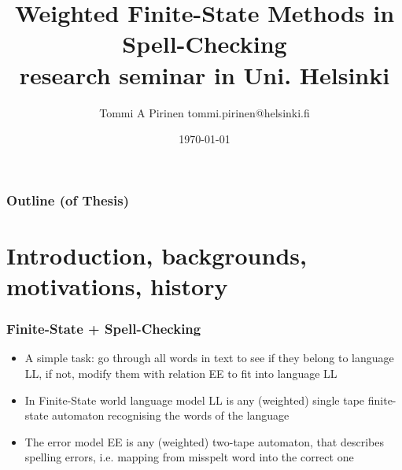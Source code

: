 \documentclass[t,12pt]{beamer}
\title{Weighted Finite-State Methods in Spell-Checking\\
\scriptsize{research seminar in Uni. Helsinki}}
\author{Tommi A Pirinen \scriptsize \guilsinglleft{}tommi.pirinen@helsinki.fi\guilsinglright{}}
\institute{University of Helsinki\\Department of Modern Languages}
\date{\today}
\begin{document}

\HyTitle

\begin{frame}
    \frametitle{Outline (of Thesis)}
    \tableofcontents
\end{frame}



\section{Introduction, backgrounds, motivations, history}

\begin{frame}
    \frametitle{Finite-State + Spell-Checking}
    \begin{itemize}
        \item A simple task: go through all words in text to see if they
            belong to language LL, if not, modify them with relation
            EE to fit into language LL
        \item In Finite-State world language model LL is any (weighted) single
            tape finite-state automaton recognising the words of the
            language
        \item The error model EE is any (weighted) two-tape automaton, that
            describes spelling errors, i.e. mapping from misspelt word into
            the correct one
    \end{itemize}
\end{frame}
\end{document}
